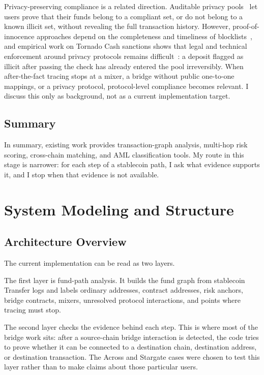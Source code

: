 \documentclass[12pt,a4paper]{article}
\begin{document}
Privacy-preserving compliance is a related direction. Auditable privacy pools~\cite{buterin2023} let users prove that their funds belong to a compliant set, or do not belong to a known illicit set, without revealing the full transaction history. However, proof-of-innocence approaches depend on the completeness and timeliness of blocklists~\cite{constantinides2025}, and empirical work on Tornado Cash sanctions shows that legal and technical enforcement around privacy protocols remains difficult~\cite{brownworth2024}: a deposit flagged as illicit after passing the check has already entered the pool irreversibly. When after-the-fact tracing stops at a mixer, a bridge without public one-to-one mappings, or a privacy protocol, protocol-level compliance becomes relevant. I discuss this only as background, not as a current implementation target.

\subsection{Summary}

In summary, existing work provides transaction-graph analysis, multi-hop risk scoring, cross-chain matching, and AML classification tools. My route in this stage is narrower: for each step of a stablecoin path, I ask what evidence supports it, and I stop when that evidence is not available.

\section{System Modeling and Structure}

\subsection{Architecture Overview}

The current implementation can be read as two layers.

The first layer is fund-path analysis. It builds the fund graph from stablecoin Transfer logs and labels ordinary addresses, contract addresses, risk anchors, bridge contracts, mixers, unresolved protocol interactions, and points where tracing must stop.

The second layer checks the evidence behind each step. This is where most of the bridge work sits: after a source-chain bridge interaction is detected, the code tries to prove whether it can be connected to a destination chain, destination address, or destination transaction. The Across and Stargate cases were chosen to test this layer rather than to make claims about those particular users.
\end{document}
